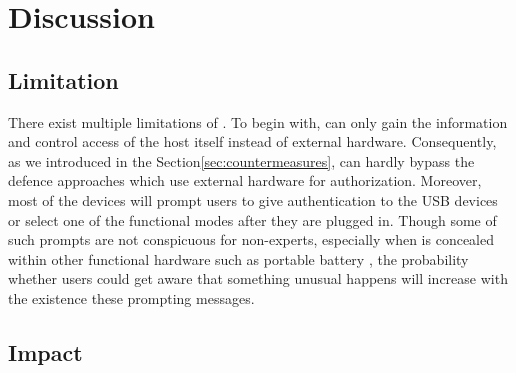\section{Discussion}
\label{sec:discussion}

\subsection{Limitation}
There exist multiple limitations of \tool.
To begin with, \tool can only gain the information and control access of the host itself instead of external hardware.
Consequently, as we introduced in the Section\ref{sec:countermeasures}, \tool can hardly bypass the defence approaches which use external hardware for authorization.
Moreover, most of the devices will prompt users to give authentication to the USB devices or select one of the functional modes after they are plugged in.
Though some of such prompts are not conspicuous for non-experts, especially when \tool is concealed within other functional hardware such as portable battery , the probability whether users could get aware that something unusual happens will increase with the existence these prompting messages.





\subsection{Impact}

